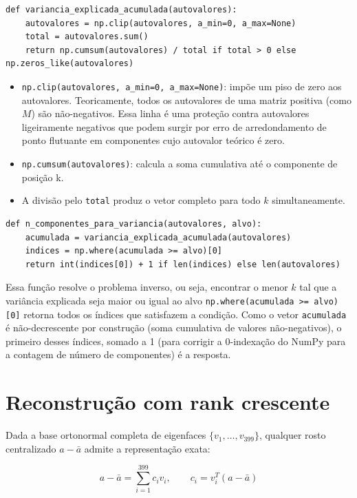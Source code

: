 \documentclass[12pt,a4paper]{article}
\begin{document}
\begin{lstlisting}
def variancia_explicada_acumulada(autovalores):
    autovalores = np.clip(autovalores, a_min=0, a_max=None)
    total = autovalores.sum()
    return np.cumsum(autovalores) / total if total > 0 else np.zeros_like(autovalores)
\end{lstlisting}

\begin{itemize}
  \item \texttt{np.clip(autovalores, a\_min=0, a\_max=None)}: impõe um piso de zero aos autovalores.
  Teoricamente, todos os autovalores de uma matriz positiva (como $M$)
  são não-negativos. Essa linha é uma proteção contra autovalores ligeiramente
  negativos que podem surgir por erro de arredondamento de ponto flutuante em
  componentes cujo autovalor teórico é zero.
  \item \texttt{np.cumsum(autovalores)}: calcula a soma cumulativa até o componente de posição k.
  \item A divisão pelo \texttt{total} produz o vetor completo para todo $k$ simultaneamente.
\end{itemize}

\begin{lstlisting}
def n_componentes_para_variancia(autovalores, alvo):
    acumulada = variancia_explicada_acumulada(autovalores)
    indices = np.where(acumulada >= alvo)[0]
    return int(indices[0]) + 1 if len(indices) else len(autovalores)
\end{lstlisting}

Essa função resolve o problema inverso, ou seja, encontrar o menor $k$ tal
que a variância explicada seja maior ou igual ao alvo \texttt{np.where(acumulada >= alvo)[0]} retorna todos
os índices que satisfazem a condição. Como o vetor \texttt{acumulada} é não-decrescente por construção (soma cumulativa de valores
não-negativos), o primeiro desses índices, somado a 1 (para corrigir a 0-indexação
do NumPy para a contagem de número de componentes) é a resposta.

\section{Reconstrução com rank crescente}

Dada a base ortonormal completa de eigenfaces $\{v_1,\dots,v_{399}\}$, qualquer rosto
centralizado $a-\bar a$ admite a representação exata:

$$a - \bar a = \sum_{i=1}^{399} c_i v_i, \qquad c_i = v_i^T(a-\bar a)$$
\end{document}
